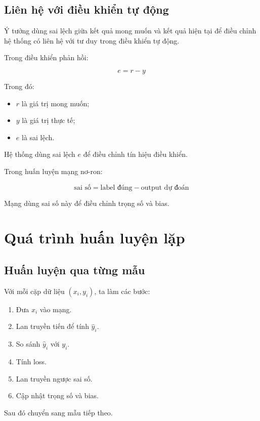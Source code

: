 \documentclass[12pt,a4paper]{report}
\begin{document}
\section{Liên hệ với điều khiển tự động}

Ý tưởng dùng sai lệch giữa kết quả mong muốn và kết quả hiện tại để điều chỉnh hệ thống có liên hệ với tư duy trong điều khiển tự động.

Trong điều khiển phản hồi:

\[
    e = r - y
\]

Trong đó:

\begin{itemize}
    \item $r$ là giá trị mong muốn;
    \item $y$ là giá trị thực tế;
    \item $e$ là sai lệch.
\end{itemize}

Hệ thống dùng sai lệch $e$ để điều chỉnh tín hiệu điều khiển.

Trong huấn luyện mạng nơ-ron:

\[
    \text{sai số} = \text{label đúng} - \text{output dự đoán}
\]

Mạng dùng sai số này để điều chỉnh trọng số và bias.

\chapter{Quá trình huấn luyện lặp}

\section{Huấn luyện qua từng mẫu}

Với mỗi cặp dữ liệu $(x_i,y_i)$, ta làm các bước:

\begin{enumerate}
    \item Đưa $x_i$ vào mạng.
    \item Lan truyền tiến để tính $\hat{y}_i$.
    \item So sánh $\hat{y}_i$ với $y_i$.
    \item Tính loss.
    \item Lan truyền ngược sai số.
    \item Cập nhật trọng số và bias.
\end{enumerate}

Sau đó chuyển sang mẫu tiếp theo.
\end{document}
